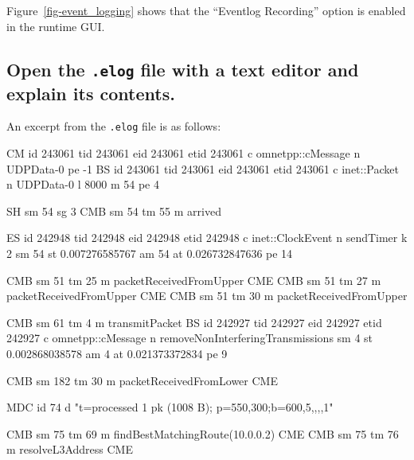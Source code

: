 \documentclass[
  letterpaper,
  DIV=11,
  numbers=noendperiod]{scrartcl}
\newenvironment{Shaded}{\begin{snugshade}}{\end{snugshade}}
\newcommand{\NormalTok}[1]{\textcolor[rgb]{0.00,0.23,0.31}{#1}}
\begin{document}
Figure~\ref{fig-event_logging} shows that the ``Eventlog Recording''
option is enabled in the runtime GUI.

\subsection{\texorpdfstring{Open the \texttt{.elog} file with a text
editor and explain its
contents.}{Open the .elog file with a text editor and explain its contents.}}\label{open-the-.elog-file-with-a-text-editor-and-explain-its-contents.}

An excerpt from the \texttt{.elog} file is as follows:

\begin{Shaded}
\begin{Highlighting}[]
\NormalTok{CM id 243061 tid 243061 eid 243061}
\NormalTok{  etid 243061 c}
\NormalTok{    omnetpp::cMessage n UDPData{-}0 pe {-}1}
\NormalTok{BS id 243061 tid 243061 eid 243061}
\NormalTok{  etid 243061 c}
\NormalTok{    inet::Packet n}
\NormalTok{      UDPData{-}0 l 8000 m 54 pe 4}

\NormalTok{SH sm 54 sg 3}
\NormalTok{CMB sm 54 tm 55 m arrived}

\NormalTok{ES id 242948 tid 242948 eid 242948}
\NormalTok{  etid 242948 c}
\NormalTok{    inet::ClockEvent n}
\NormalTok{      sendTimer k 2 sm 54 st}
\NormalTok{        0.007276585767 am 54 at}
\NormalTok{          0.026732847636 pe 14}

\NormalTok{CMB sm 51 tm 25 m packetReceivedFromUpper}
\NormalTok{CME}
\NormalTok{CMB sm 51 tm 27 m packetReceivedFromUpper}
\NormalTok{CME}
\NormalTok{CMB sm 51 tm 30 m packetReceivedFromUpper}

\NormalTok{CMB sm 61 tm 4 m transmitPacket}
\NormalTok{BS id 242927 tid 242927 eid 242927}
\NormalTok{  etid 242927 c}
\NormalTok{    omnetpp::cMessage n}
\NormalTok{      removeNonInterferingTransmissions}
\NormalTok{        sm 4 st 0.002868038578}
\NormalTok{          am 4 at 0.021373372834}
\NormalTok{            pe 9}

\NormalTok{CMB sm 182 tm 30 m packetReceivedFromLower}
\NormalTok{CME}

\NormalTok{MDC id 74 d}
\NormalTok{  "t=processed 1 pk (1008 B);}
\NormalTok{    p=550,300;b=600,5,,,,1"}

\NormalTok{CMB sm 75 tm 69 m}
\NormalTok{  findBestMatchingRoute(10.0.0.2)}
\NormalTok{CME}
\NormalTok{CMB sm 75 tm 76 m}
\NormalTok{  resolveL3Address}
\NormalTok{CME}
\end{Highlighting}
\end{Shaded}
\end{document}
